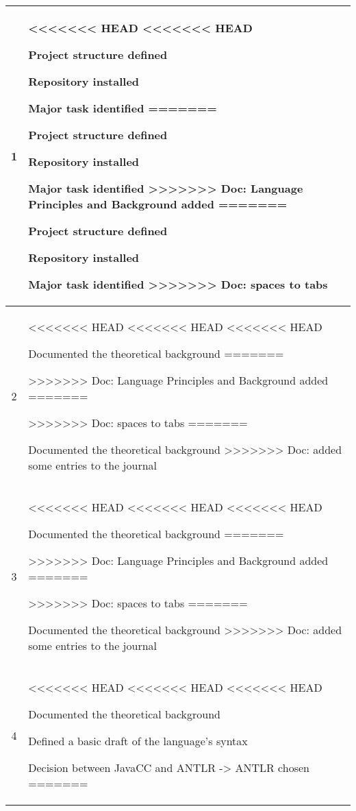 \begin{center}
\begin{longtable}{|c|p{12cm}|}
1 & 
\begin{journal}
<<<<<<< HEAD
<<<<<<< HEAD
	\item Project structure defined
	\item Repository installed
	\item Major task identified
=======
  \item Project structure defined
  \item Repository installed
  \item Major task identified
>>>>>>> Doc: Language Principles and Background added
=======
	\item Project structure defined
	\item Repository installed
	\item Major task identified
>>>>>>> Doc: spaces to tabs
\end{journal}
\\ \hline
2 & 
\begin{journal}
<<<<<<< HEAD
<<<<<<< HEAD
<<<<<<< HEAD
	\item Documented the theoretical background
=======
  \item 
>>>>>>> Doc: Language Principles and Background added
=======
	\item 
>>>>>>> Doc: spaces to tabs
=======
	\item Documented the theoretical background
>>>>>>> Doc: added some entries to the journal
\end{journal}
\\ \hline
3 & 
\begin{journal}
<<<<<<< HEAD
<<<<<<< HEAD
<<<<<<< HEAD
	\item Documented the theoretical background
=======
  \item 
>>>>>>> Doc: Language Principles and Background added
=======
	\item 
>>>>>>> Doc: spaces to tabs
=======
	\item Documented the theoretical background
>>>>>>> Doc: added some entries to the journal
\end{journal}
\\ \hline
4 & 
\begin{journal}
<<<<<<< HEAD
<<<<<<< HEAD
<<<<<<< HEAD
	\item Documented the theoretical background
	\item Defined a basic draft of the language's syntax
	\item Decision between JavaCC and ANTLR -> ANTLR chosen
=======
  \item 

\end{journal}
\end{longtable}
\end{center}
